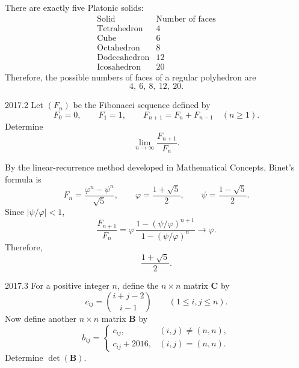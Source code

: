     \begin{solution}
        There are exactly five Platonic solids:
        \[
            \begin{array}{c|c}
                \text{Solid} & \text{Number of faces} \\
                \hline
                \text{Tetrahedron} & 4 \\
                \text{Cube} & 6 \\
                \text{Octahedron} & 8 \\
                \text{Dodecahedron} & 12 \\
                \text{Icosahedron} & 20
            \end{array}
        \]
        Therefore, the possible numbers of faces of a regular polyhedron are
        \[
            \boxed{4,\ 6,\ 8,\ 12,\ 20}.
        \]
    \end{solution}

    \begin{pastproblem}{2017.2}
        Let $(F_n)$ be the Fibonacci sequence defined by
        \[
            F_0=0,\qquad F_1=1,\qquad F_{n+1}=F_n+F_{n-1}\quad(n\geq1).
        \]
        Determine
        \[
            \lim\limits_{n\to\infty}\frac{F_{n+1}}{F_n}.
        \]
    \end{pastproblem}

    \begin{solution}
        By the linear-recurrence method developed in Mathematical Concepts,
        Binet's formula is
        \[
            F_n=\frac{\varphi^n-\psi^n}{\sqrt5},
            \qquad
            \varphi=\frac{1+\sqrt5}{2},
            \qquad
            \psi=\frac{1-\sqrt5}{2}.
        \]
        Since $|\psi/\varphi|<1$,
        \[
            \frac{F_{n+1}}{F_n}
            =
            \varphi\,
            \frac{1-(\psi/\varphi)^{n+1}}
                 {1-(\psi/\varphi)^n}
            \longrightarrow
            \varphi.
        \]
        Therefore,
        \[
            \boxed{\frac{1+\sqrt5}{2}}.
        \]
    \end{solution}

    \begin{pastproblem}{2017.3}
        For a positive integer $n$, define the $n\times n$ matrix $\mathbf{C}$ by
        \[
            c_{ij}
            =
            \binom{i+j-2}{i-1}
            \qquad
            (1\leq i,j\leq n).
        \]
        Now define another $n\times n$ matrix $\mathbf{B}$ by
        \[
            b_{ij}
            =
            \begin{cases}
                c_{ij}, & (i,j)\neq (n,n), \\
                c_{ij}+2016, & (i,j)=(n,n).
            \end{cases}
        \]
        Determine $\det(\mathbf{B})$.
    \end{pastproblem}

